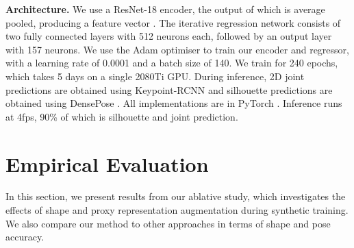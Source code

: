 \documentclass{bmvc2k}
\begin{document}
\noindent \textbf{Architecture.} We use a ResNet-18 \cite{He2015} encoder, the output of which is average pooled, producing a feature vector . The iterative regression network consists of two fully connected layers with 512 neurons each, followed by an output layer with 157 neurons. We use the Adam \cite{kingma2014adam} optimiser to train our encoder and regressor, with a learning rate of 0.0001 and a batch size of 140. We train for 240 epochs, which takes 5 days on a single 2080Ti GPU. During inference, 2D joint predictions are obtained using Keypoint-RCNN \cite{he2017maskrcnn} and silhouette predictions are obtained using DensePose \cite{Guler2018DensePose}. All implementations are in PyTorch \cite{Pytorch_NEURIPS2019_9015}. Inference runs at 4fps, 90\% of which is silhouette and joint prediction.

\section{Empirical Evaluation}
\label{sec:empirical_results}

In this section, we present results from our ablative study, which investigates the effects of shape and proxy representation augmentation during synthetic training. We also compare our method to other approaches in terms of shape and pose accuracy.
\end{document}

